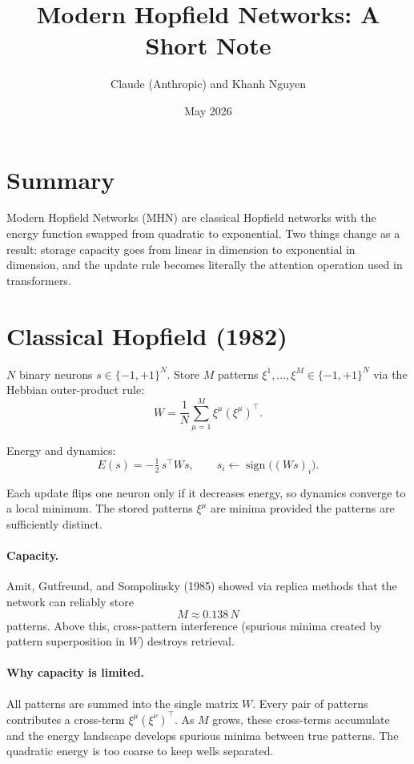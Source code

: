\documentclass[11pt,a4paper]{article}
\title{Modern Hopfield Networks: A Short Note}
\author{Claude (Anthropic) and Khanh Nguyen}
\date{May 2026}
\begin{document}
\maketitle

\section{Summary}

Modern Hopfield Networks (MHN) are classical Hopfield networks with the
energy function swapped from quadratic to exponential. Two things change
as a result: storage capacity goes from linear in dimension to exponential
in dimension, and the update rule becomes literally the attention
operation used in transformers.

\section{Classical Hopfield (1982)}

$N$ binary neurons $s \in \{-1, +1\}^N$. Store $M$ patterns
$\xi^1, \dots, \xi^M \in \{-1, +1\}^N$ via the Hebbian outer-product rule:
\[
W = \frac{1}{N} \sum_{\mu=1}^M \xi^\mu (\xi^\mu)^\top.
\]

Energy and dynamics:
\[
E(s) = -\tfrac{1}{2}\, s^\top W s,
\qquad
s_i \leftarrow \operatorname{sign}\!\bigl((W s)_i\bigr).
\]

Each update flips one neuron only if it decreases energy, so dynamics
converge to a local minimum. The stored patterns $\xi^\mu$ are minima
provided the patterns are sufficiently distinct.

\paragraph{Capacity.} Amit, Gutfreund, and Sompolinsky (1985) showed via
replica methods that the network can reliably store
\[
M \approx 0.138 \, N
\]
patterns. Above this, cross-pattern interference (spurious minima
created by pattern superposition in $W$) destroys retrieval.

\paragraph{Why capacity is limited.} All patterns are summed into the
single matrix $W$. Every pair of patterns contributes a cross-term
$\xi^\mu (\xi^\nu)^\top$. As $M$ grows, these cross-terms accumulate and
the energy landscape develops spurious minima between true patterns. The
quadratic energy is too coarse to keep wells separated.
\end{document}
